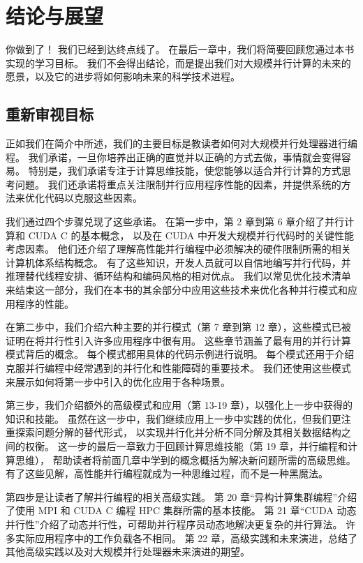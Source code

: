 \section{结论与展望}
你做到了！ 我们已经到达终点线了。 在最后一章中，我们将简要回顾您通过本书实现的学习目标。 
我们不会得出结论，而是提出我们对大规模并行计算的未来的愿景，以及它的进步将如何影响未来的科学技术进程。

\subsection{重新审视目标}
正如我们在简介中所述，我们的主要目标是教读者如何对大规模并行处理器进行编程。 
我们承诺，一旦你培养出正确的直觉并以正确的方式去做，事情就会变得容易。 
特别是，我们承诺专注于计算思维技能，使您能够以适合并行计算的方式思考问题。 
我们还承诺将重点关注限制并行应用程序性能的因素，并提供系统的方法来优化代码以克服这些因素。

我们通过四个步骤兑现了这些承诺。 在第一步中，第 2 章到第 6 章介绍了并行计算和 CUDA C 的基本概念，
以及在 CUDA 中开发大规模并行代码时的关键性能考虑因素。 
他们还介绍了理解高性能并行编程中必须解决的硬件限制所需的相关计算机体系结构概念。 
有了这些知识，开发人员就可以自信地编写并行代码，并推理替代线程安排、循环结构和编码风格的相对优点。 
我们以常见优化技术清单来结束这一部分，我们在本书的其余部分中应用这些技术来优化各种并行模式和应用程序的性能。

在第二步中，我们介绍六种主要的并行模式（第 7 章到第 12 章），这些模式已被证明在将并行性引入许多应用程序中很有用。 
这些章节涵盖了最有用的并行计算模式背后的概念。 每个模式都用具体的代码示例进行说明。 
每个模式还用于介绍克服并行编程中经常遇到的并行化和性能障碍的重要技术。 
我们还使用这些模式来展示如何将第一步中引入的优化应用于各种场景。

第三步，我们介绍额外的高级模式和应用（第 13-19 章），以强化上一步中获得的知识和技能。 
虽然在这一步中，我们继续应用上一步中实践的优化，但我们更注重探索问题分解的替代形式，
以实现并行化并分析不同分解及其相关数据结构之间的权衡。 
这一步的最后一章致力于回顾计算思维技能（第 19 章，并行编程和计算思维），
帮助读者将前面几章中学到的概念概括为解决新问题所需的高级思维。 
有了这些见解，高性能并行编程就成为一种思维过程，而不是一种黑魔法。

第四步是让读者了解并行编程的相关高级实践。 
第 20 章“异构计算集群编程”介绍了使用 MPI 和 CUDA C 编程 HPC 集群所需的基本技能。
第 21 章“CUDA 动态并行性”介绍了动态并行性，可帮助并行程序员动态地解决更复杂的并行算法。 
许多实际应用程序中的工作负载各不相同。 
第 22 章，高级实践和未来演进，总结了其他高级实践以及对大规模并行处理器未来演进的期望。

